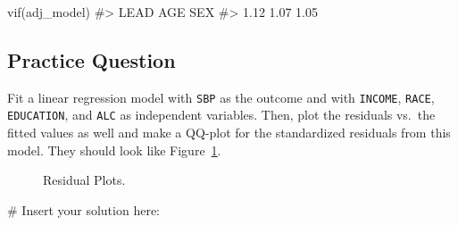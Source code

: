 \documentclass[
  letterpaper,
]{latex/krantz}
\makeatletter
\newenvironment{Shaded}{\begin{snugshade}}{\end{snugshade}}
\newcommand{\CommentTok}[1]{\textcolor[rgb]{0.37,0.37,0.37}{#1}}
\newcommand{\FunctionTok}[1]{\textcolor[rgb]{0.28,0.35,0.67}{#1}}
\newcommand{\NormalTok}[1]{\textcolor[rgb]{0.00,0.23,0.31}{#1}}
\newenvironment{kframe}{%
\medskip{}
\setlength{\fboxsep}{.8em}
 \def\at@end@of@kframe{}%
 \ifinner\ifhmode%
  \def\at@end@of@kframe{\end{minipage}}%
  \begin{minipage}{\columnwidth}%
 \fi\fi%
 \def\FrameCommand##1{\hskip\@totalleftmargin \hskip-\fboxsep
 \colorbox{shadecolor}{##1}\hskip-\fboxsep
     \hskip-\linewidth \hskip-\@totalleftmargin \hskip\columnwidth}%
 \MakeFramed {\advance\hsize-\width
   \@totalleftmargin\z@ \linewidth\hsize
   \@setminipage}}%
 {\par\unskip\endMakeFramed%
 \at@end@of@kframe}
\renewenvironment{Shaded}{\begin{kframe}}{\end{kframe}}
\makeatother
\begin{document}
\begin{Shaded}
\begin{Highlighting}[]
\FunctionTok{vif}\NormalTok{(adj\_model)}
\CommentTok{\#\textgreater{} LEAD  AGE  SEX }
\CommentTok{\#\textgreater{} 1.12 1.07 1.05}
\end{Highlighting}
\end{Shaded}

\subsection{Practice Question}\label{practice-question-21}

Fit a linear regression model with \texttt{SBP} as the outcome and with
\texttt{INCOME}, \texttt{RACE}, \texttt{EDUCATION}, and \texttt{ALC} as
independent variables. Then, plot the residuals vs.~the fitted values as
well and make a QQ-plot for the standardized residuals from this model.
They should look like Figure~\ref{fig-residual-plots}.

\begin{figure}


\caption{\label{fig-residual-plots}Residual Plots.}

\end{figure}%

\begin{Shaded}
\begin{Highlighting}[]
\CommentTok{\# Insert your solution here: }
\end{Highlighting}
\end{Shaded}
\end{document}
